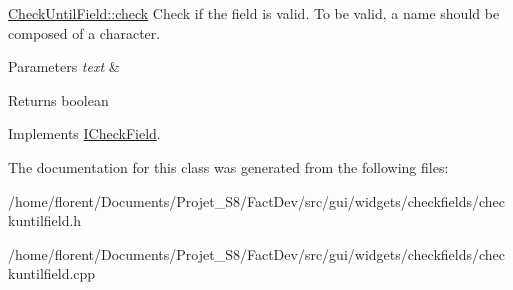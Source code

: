 \hyperlink{classCheckUntilField_acfb9e2f95bebcb5b5d2337e3ac4f4d47}{Check\-Until\-Field\-::check} Check if the field is valid. To be valid, a name should be composed of a character. 


\begin{DoxyParams}{Parameters}
{\em text} & \\
\hline
\end{DoxyParams}
\begin{DoxyReturn}{Returns}
boolean 
\end{DoxyReturn}


Implements \hyperlink{classICheckField_a6bd42b4d49c165cdd92822135123fd4b}{I\-Check\-Field}.



The documentation for this class was generated from the following files\-:\begin{DoxyCompactItemize}
\item 
/home/florent/\-Documents/\-Projet\-\_\-\-S8/\-Fact\-Dev/src/gui/widgets/checkfields/checkuntilfield.\-h\item 
/home/florent/\-Documents/\-Projet\-\_\-\-S8/\-Fact\-Dev/src/gui/widgets/checkfields/checkuntilfield.\-cpp\end{DoxyCompactItemize}
